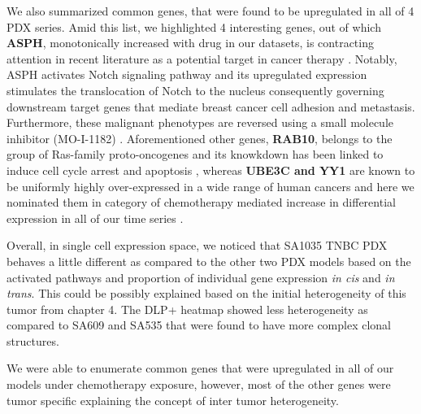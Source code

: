 We also summarized common genes, that were found to be upregulated in all of 4 PDX series. Amid this list, we highlighted 4 interesting genes, out of which \textbf{ASPH}, monotonically increased with drug in our datasets, is contracting attention in recent literature as a potential target in cancer therapy \cite{barboro2020aspartate, li2018expression, hou2018recent, kanwal2020aspartate}. Notably, ASPH activates Notch signaling pathway and its upregulated expression stimulates the translocation of Notch to the nucleus consequently governing downstream target genes that mediate breast cancer cell adhesion and metastasis. Furthermore, these malignant phenotypes are reversed using a small molecule inhibitor (MO-I-1182) \cite{lin2019asph}. Aforementioned other genes, \textbf{RAB10}, belongs to the group of Ras-family proto-oncogenes and its knowkdown has been linked to induce cell cycle arrest and apoptosis \cite{zhou2018down}, whereas \textbf{UBE3C and YY1} are known to be uniformly highly over-expressed in a wide range of human cancers and here we nominated them in category of chemotherapy mediated increase in  differential expression in all of our time series \cite{pan2015ubiquitin, zhang2020ube3c, meliala2020biological, wan2012yin}. 

Overall, in single cell expression space, we noticed that SA1035 TNBC PDX behaves a little different as compared to the other two PDX models based on the activated pathways and proportion of individual gene expression \textit{in cis} and \textit{in trans}. This could be possibly explained based on the initial heterogeneity of this tumor from chapter 4. The DLP+ heatmap showed less heterogeneity as compared to SA609 and SA535 that were found to have more complex clonal structures.

 We were able to enumerate common genes that were upregulated in all of our models under chemotherapy exposure, however, most of the other genes were tumor specific explaining the concept of inter tumor heterogeneity.
 












